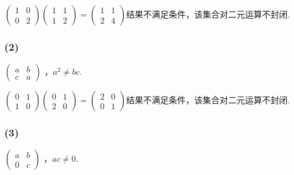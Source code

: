 \jie$\begin{pmatrix}
1 & 0\\
0 & 2
\end{pmatrix}
\begin{pmatrix}
1 & 1\\
1 & 2
\end{pmatrix}
=
\begin{pmatrix}
1 & 1\\
2 & 4
\end{pmatrix}
$结果不满足条件，该集合对二元运算不封闭.
\subsubsection{(2)}
$\begin{pmatrix}
a & b\\
c & a
\end{pmatrix}$
，$a^2\neq bc$.

\jie$\begin{pmatrix}
0 & 1\\
1 & 0
\end{pmatrix}
\begin{pmatrix}
0 & 1\\
2 & 0
\end{pmatrix}
=
\begin{pmatrix}
2 & 0\\
0 & 1
\end{pmatrix}
$结果不满足条件，该集合对二元运算不封闭.
\subsubsection{(3)}
$\begin{pmatrix}
a & b\\
0 & c
\end{pmatrix}$
，$ac\neq 0$.

